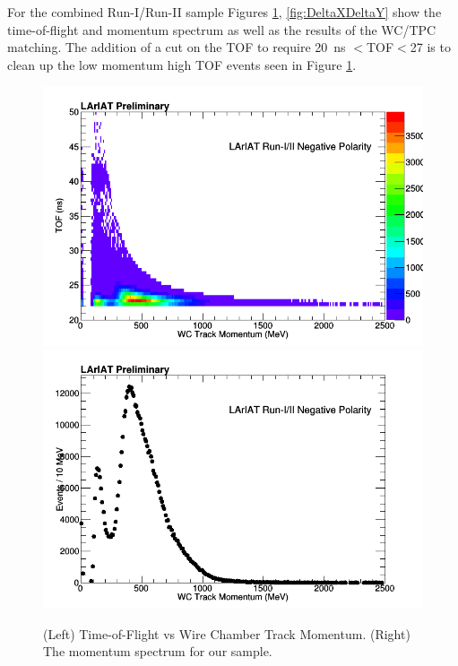 For the combined Run-I/Run-II sample Figures \ref{fig:WCandTOFBeamlinePlot}, \ref{fig:DeltaXDeltaY} show the time-of-flight and momentum spectrum as well as the results of the WC/TPC matching. The addition of a cut on the TOF to require  20~ns $<$TOF$<$27 is to clean up the low momentum high TOF events seen in Figure \ref{fig:WCandTOFBeamlinePlot}.

\begin{figure}[h!]
\centering
\includegraphics[scale=0.30]{./images/TOFvsWCTrk.png}
\includegraphics[scale=0.30]{./images/wctrkMomentum.png}
\caption{(Left) Time-of-Flight vs Wire Chamber Track Momentum. (Right) The momentum spectrum for our sample.}
\label{fig:WCandTOFBeamlinePlot}
\end{figure}

